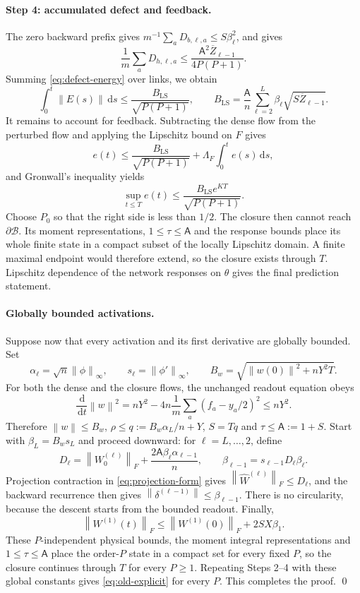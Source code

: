 \documentclass[11pt]{article}
\theoremstyle{definition}
\theoremstyle{remark}
\newcommand{\norm}[1]{\left\lVert #1\right\rVert}
\newcommand{\dd}{\,\mathrm{d}}
\begin{document}
\paragraph{Step 4: accumulated defect and feedback.}
The zero backward prefix gives $m^{-1}\sum_aD_{b,\ell,a}\le S\beta_\ell^2$, and
 gives
\[
 \frac1m\sum_aD_{h,\ell,a}
 \le\frac{\mathsf A^2\overline Z_{\ell-1}}{4P(P+1)}.
\]
Summing \eqref{eq:defect-energy} over links, we obtain
\begin{equation}
 \int_0^t\norm{E(s)}\dd s
 \le\frac{B_{\mathrm{LS}}}{\sqrt{P(P+1)}},\qquad
 B_{\mathrm{LS}}=\frac{\mathsf A}{n}
 \sum_{\ell=2}^L\beta_\ell\sqrt{S\overline Z_{\ell-1}}. \label{eq:old-defect-bound}
\end{equation}
It remains to account for feedback.  Subtracting the dense flow from the
perturbed flow and applying the Lipschitz bound on $F$ gives
\[
 e(t)\le\frac{B_{\mathrm{LS}}}{\sqrt{P(P+1)}}
 +\Lambda_F\int_0^te(s)\dd s,
\]
and Gronwall's inequality yields
\begin{equation}
 \sup_{t\le T}e(t)\le
 \frac{B_{\mathrm{LS}}e^{KT}}{\sqrt{P(P+1)}}.       \label{eq:old-explicit}
\end{equation}
Choose $P_0$ so that the right side is less than $1/2$.  The closure then
cannot reach $\partial\mathcal B$.  Its moment representations,
$1\le\tau\le\mathsf A$ and the response bounds place its whole finite state in a
compact subset of the locally Lipschitz domain.  A finite maximal endpoint would
therefore extend, so the closure exists through $T$.  Lipschitz dependence of
the network responses on $\theta$ gives the final prediction statement.

\paragraph{Globally bounded activations.}
Suppose now that every activation and its first derivative are globally
bounded.  Set
\[
 \alpha_\ell=\sqrt n\norm{\phi}_\infty,\qquad
 s_\ell=\norm{\phi'}_\infty,\qquad
 B_w=\sqrt{\norm{w(0)}^2+nY^2T}.
\]
For both the dense and the closure flows, the unchanged readout equation obeys
\[
 \frac{\dd}{\dd t}\norm w^2
 =nY^2-4n\frac1m\sum_a(f_a-y_a/2)^2\le nY^2.
\]
Therefore $\norm w\le B_w$, $\rho\le q:=B_w\alpha_L/n+Y$, $S=Tq$ and
$\tau\le\mathsf A:=1+S$.  Start with $\beta_L=B_ws_L$ and proceed downward: for
$\ell=L,\ldots,2$, define
\[
 D_\ell=\norm{W_0^{(\ell)}}_F+
 \frac{2\mathsf A\beta_\ell\alpha_{\ell-1}}{n},
 \qquad \beta_{\ell-1}=s_{\ell-1}D_\ell\beta_\ell.
\]
Projection contraction in \eqref{eq:projection-form} gives
$\norm{\widehat W^{(\ell)}}_F\le D_\ell$, and the backward recurrence then gives
$\norm{\delta^{(\ell-1)}}\le\beta_{\ell-1}$.  There is no circularity, because
the descent starts from the bounded readout.  Finally,
\[
 \norm{W^{(1)}(t)}_F\le\norm{W^{(1)}(0)}_F+2SX\beta_1.
\]
These $P$-independent physical bounds, the moment integral representations and
$1\le\tau\le\mathsf A$ place the order-$P$ state in a compact set for every
fixed $P$, so the closure continues through $T$ for every $P\ge1$.  Repeating
Steps 2--4 with these global constants gives \eqref{eq:old-explicit} for every
$P$.  This completes the proof. \qed
\end{document}
